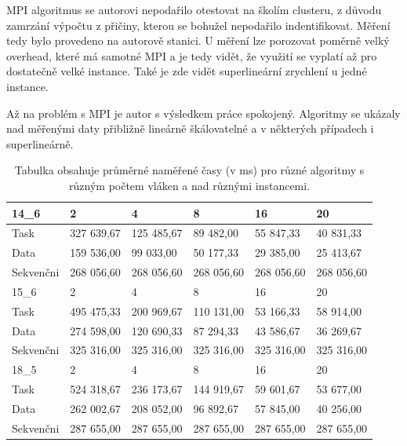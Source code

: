 \documentclass{article}%
\begin{document}
MPI algoritmus se autorovi nepodařilo otestovat na školím clusteru, z důvodu zamrzání výpočtu z přičiny, kterou se bohužel nepodařilo indentifikovat. Měření tedy bylo provedeno na autorově stanici. U měření lze porozovat poměrně velký overhead, které má samotné MPI a je tedy vidět, že využití se vyplatí až pro dostatečně velké instance. Také je zde vidět superlineární zrychlení u jedné instance.

Až na problém s MPI je autor s výsledkem práce spokojený. Algoritmy se ukázaly nad měřenými daty přibližně lineárně škálovatelné a v některých případech i superlineárně.


\newpage

\begin{table}[]
    \begin{tabular}{l|lllll}
        14\_6     & 2          & 4          & 8          & 16         & 20         \\ \hline
        Task      & 327 639,67 & 125 485,67 & 89 482,00  & 55 847,33  & 40 831,33  \\
        Data      & 159 536,00 & 99 033,00  & 50 177,33  & 29 385,00  & 25 413,67  \\
        Sekvenčni & 268 056,60 & 268 056,60 & 268 056,60 & 268 056,60 & 268 056,60 \\ \hline
        15\_6     & 2          & 4          & 8          & 16         & 20         \\ \hline
        Task      & 495 475,33 & 200 969,67 & 110 131,00 & 53 166,33  & 58 914,00  \\
        Data      & 274 598,00 & 120 690,33 & 87 294,33  & 43 586,67  & 36 269,67  \\
        Sekvenčni & 325 316,00 & 325 316,00 & 325 316,00 & 325 316,00 & 325 316,00 \\ \hline
        18\_5     & 2          & 4          & 8          & 16         & 20         \\ \hline
        Task      & 524 318,67 & 236 173,67 & 144 919,67 & 59 601,67  & 53 677,00  \\
        Data      & 262 002,67 & 208 052,00 & 96 892,67  & 57 845,00  & 40 256,00  \\
        Sekvenčni & 287 655,00 & 287 655,00 & 287 655,00 & 287 655,00 & 287 655,00
    \end{tabular}
    \caption{Tabulka obsahuje průměrné naměřené časy (v ms) pro různé algoritmy s různým počtem vláken a nad různými instancemi.}
\end{table}
\end{document}
